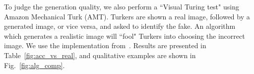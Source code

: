 To judge the generation quality, we also perform a ``Visual Turing test" using Amazon Mechanical Turk (AMT). Turkers are shown a real image, followed by a generated image, or vice versa, and asked to identify the fake. An algorithm which generates a realistic image will ``fool" Turkers into choosing the incorrect image. We use the implementation from~\cite{zhang2016colorful}.
Results are presented in Table~\ref{fig:acc_vs_real}, and qualitative examples are shown in Fig.~\ref{fig:alg_comp}.




